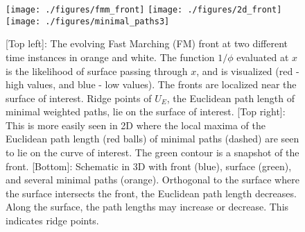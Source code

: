 \documentclass[10pt,journal,compsoc]{IEEEtran}
\newcommand{\comment}[1]{ }
\begin{document}
\def\fHeightFront{1.0in}
\begin{figure}
\centering
\texttt{[image: ./figures/fmm\_front]}
\texttt{[image: ./figures/2d\_front]} \\ \vspace{1mm}
\texttt{[image: ./figures/minimal\_paths3]}
\caption{[Top left]: The evolving Fast Marching (FM) front at two
  different time instances in orange and white. The function $1/\phi$
  evaluated at $x$ is the likelihood of surface passing through $x$,
  and is visualized (red - high values, and blue - low values).  The
  fronts are localized near the surface of interest. Ridge points of
  $U_E$, the Euclidean path length of minimal weighted paths, lie on
  the surface of interest.  [Top right]: This is more easily seen in 2D
  where the local maxima of the Euclidean path length (red balls) of
  minimal paths (dashed) are seen to lie on the curve of interest. The
  green contour is a snapshot of the front. [Bottom]: Schematic in 3D
  with front (blue), surface (green), and several minimal paths
  (orange). Orthogonal to the surface where the surface intersects the
  front, the Euclidean path length decreases. Along the surface, the
  path lengths may increase or decrease. This indicates ridge points.}
\label{fig:fmm-front}
\end{figure}

\comment{
points on the surface being
ridge points of $U_E$ defined on the front $F$ produced by Fast
Marching.
}
\end{document}

